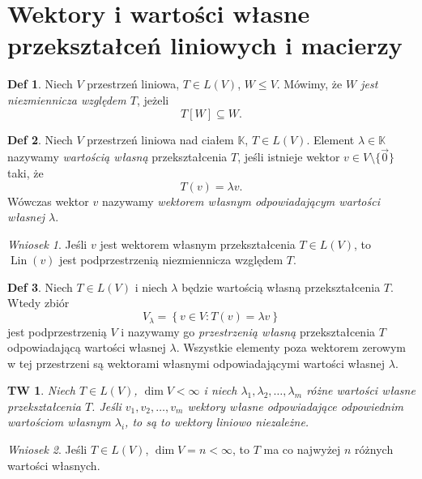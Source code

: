 \documentclass[a4paper, 12pt]{mwart}
\DeclareMathOperator{\Lin}{Lin}
\theoremstyle{definition}
\newtheorem{definicja}{Def}[section]
\theoremstyle{plain}
\newtheorem{twierdzenie}{TW}[section]
\theoremstyle{remark}
\newtheorem{wniosek}{Wniosek}[section]
\begin{document}
\section{Wektory i wartości własne przekształceń liniowych i macierzy}
\begin{definicja}
	Niech $V$ \ppauza przestrzeń liniowa, $T \in L(V)$, $W \leq V$. Mówimy, że  \emph{$W$ jest niezmiennicza względem $T$}, jeżeli
	\begin{equation}
		T[W] \subseteq W.
	\end{equation}
\end{definicja}
\begin{definicja}
	Niech $V$ \ppauza przestrzeń liniowa nad ciałem $\mathbb{K}$, $T \in L(V)$. Element $\lambda \in \mathbb{K}$ nazywamy \emph{wartością własną} przekształcenia $T$, jeśli istnieje wektor $v \in V \setminus \{\vec{0}\}$ taki, że\begin{equation}
		T(v) = \lambda v.
	\end{equation}
	Wówczas wektor $v$ nazywamy \emph{wektorem własnym odpowiadającym wartości własnej $\lambda$}.
\end{definicja}
\begin{wniosek}
	Jeśli $v$ jest wektorem własnym przekształcenia $T \in L(V)$, to $\Lin (v)$ jest podprzestrzenią niezmiennicza względem $T$.
\end{wniosek}
\begin{definicja}
	Niech $T \in L(V)$ i niech $\lambda$ będzie wartością własną przekształcenia $T$. Wtedy zbiór
	\begin{equation}
		V_\lambda = \left\{v \in V: T(v) = \lambda v\right\}
	\end{equation}
	jest podprzestrzenią $V$ i nazywamy go \emph{przestrzenią własną} przekształcenia $T$ odpowiadającą wartości własnej $\lambda$. Wszystkie elementy poza wektorem zerowym w tej przestrzeni są wektorami własnymi odpowiadającymi wartości własnej $\lambda$.
\end{definicja}
\begin{twierdzenie}
	Niech $T \in L(V)$, $\dim V < \infty$ i niech $\lambda_1, \lambda_2, \ldots, \lambda_m$ \ppauza \emph{różne} wartości własne przekształcenia $T$. Jeśli $v_1, v_2, \ldots, v_m$ \ppauza wektory własne odpowiadające odpowiednim wartościom własnym $\lambda_i$, to są to wektory liniowo niezależne.
\end{twierdzenie}
\begin{wniosek}
	Jeśli $T \in L(V)$, $\dim V = n < \infty$, to $T$ ma co najwyżej $n$ różnych wartości własnych.
\end{wniosek}
\end{document}
